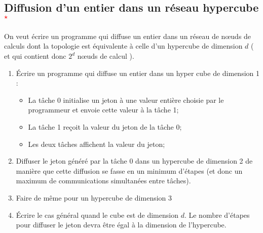 \documentclass[11pt,a4paper]{article}
\begin{document}
\begin{center}
\end{center}


\subsection{Diffusion d'un entier dans un réseau hypercube\textcolor{red}{$^{\star}$}}

On veut écrire un programme qui diffuse un entier dans un réseau de n{\oe}uds de calculs dont la topologie
est équivalente à celle d'un hypercube de dimension $d$ ( et qui contient donc $2^{d}$ n{\oe}uds de calcul ).

\begin{enumerate}
\item \'Ecrire un programme qui diffuse un entier dans un hyper cube de dimension 1 :
\begin{itemize}
\item La tâche 0 initialise un jeton à une valeur entière choisie par le programmeur et envoie cette valeur 
à la tâche 1; 
\item La tâche 1 reçoit la valeur du jeton de la tâche 0;
\item Les deux tâches affichent la valeur du jeton;
\end{itemize}
\item Diffuser le jeton généré par la tâche 0 dans un hypercube de dimension 2 de manière que cette diffusion se fasse en un minimum
d'étapes (et donc un maximum de communications simultanées entre tâches).
\item Faire de même pour un hypercube de dimension 3
\item \'Ecrire le cas général quand le cube est de dimension $d$. Le nombre d'étapes pour diffuser le jeton devra
être égal à la dimension de l'hypercube.
\end{enumerate}
\end{document}
